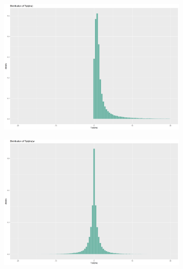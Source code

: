     \begin{figure}[t]
     \centering
     \begin{subfigure}[b]{0.49\textwidth}
         \centering
         \includegraphics[width=\textwidth]{Figures/HSprior1.png}
     \end{subfigure}
     \hfill
     \begin{subfigure}[b]{0.49\textwidth}
         \centering
         \includegraphics[width=\textwidth]{Figures/HSprior2.png}
     \end{subfigure}
     \hfill
     \begin{subfigure}[b]{0.49\textwidth}
         \centering

\end{subfigure}
\end{figure}
